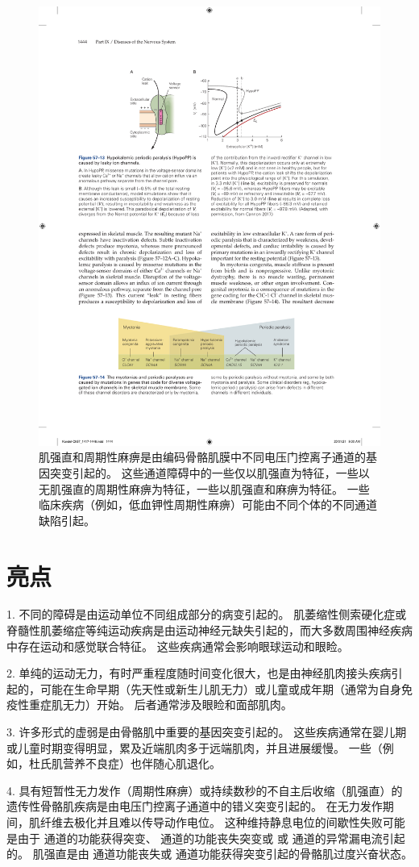 \begin{figure}[htbp]
	\centering
	\includegraphics[width=0.7\linewidth]{chap57/fig_57_14}
	\caption{肌强直和周期性麻痹是由编码骨骼肌膜中不同电压门控离子通道的基因突变引起的。
		这些通道障碍中的一些仅以肌强直为特征，一些以无肌强直的周期性麻痹为特征，一些以肌强直和麻痹为特征。
		一些临床疾病（例如，低血钾性周期性麻痹）可能由不同个体的不同通道缺陷引起。}
	\label{fig:57_14}
\end{figure}



\section{亮点}

1. 不同的障碍是由运动单位不同组成部分的病变引起的。
肌萎缩性侧索硬化症或脊髓性肌萎缩症等纯运动疾病是由运动神经元缺失引起的，而大多数周围神经疾病中存在运动和感觉联合特征。
这些疾病通常会影响眼球运动和眼睑。


2. 单纯的运动无力，有时严重程度随时间变化很大，也是由神经肌肉接头疾病引起的，可能在生命早期（先天性或新生儿肌无力）或儿童或成年期（通常为自身免疫性重症肌无力）开始。
后者通常涉及眼睑和面部肌肉。


3. 许多形式的虚弱是由骨骼肌中重要的基因突变引起的。
这些疾病通常在婴儿期或儿童时期变得明显，累及近端肌肉多于远端肌肉，并且进展缓慢。
一些（例如，杜氏肌营养不良症）也伴随心肌退化。


4. 具有短暂性无力发作（周期性麻痹）或持续数秒的不自主后收缩（肌强直）的遗传性骨骼肌疾病是由电压门控离子通道中的错义突变引起的。
在无力发作期间，肌纤维去极化并且难以传导动作电位。
这种维持静息电位的间歇性失败可能是由于  通道的功能获得突变、 通道的功能丧失突变或  或  通道的异常漏电流引起的。
肌强直是由  通道功能丧失或  通道功能获得突变引起的骨骼肌过度兴奋状态。


